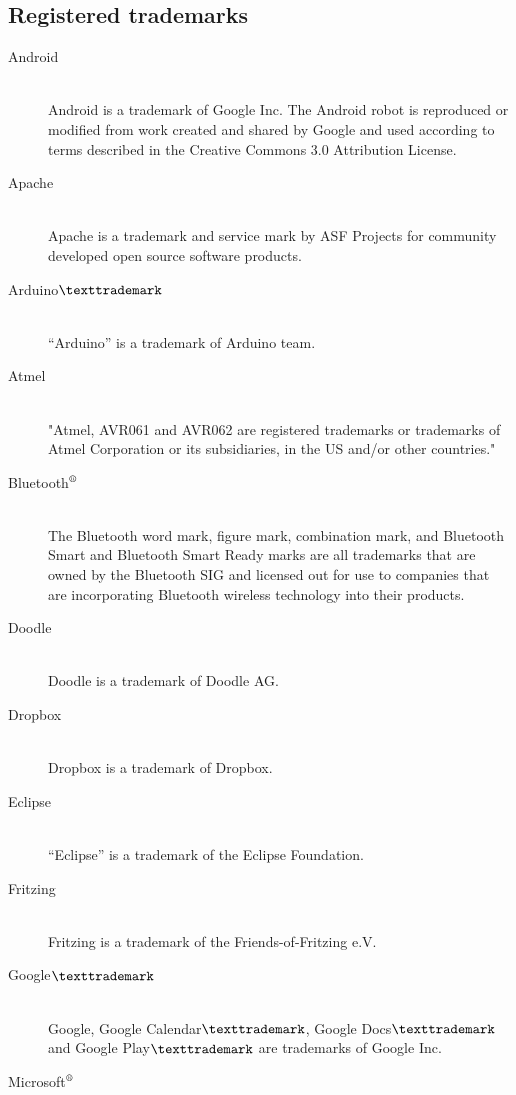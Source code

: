 \subsection{Registered trademarks}

\begin{description}
	\item[Android]\hfill \\
		Android is a trademark of Google Inc. \newline
		The Android robot is reproduced or modified from work created and shared by Google and used according to terms described in the Creative Commons 3.0 Attribution License.
	\item[Apache]\hfill \\
		Apache is a trademark and service mark by ASF Projects for community developed open source software products.
	\item[Arduino$\texttrademark$]\hfill \\
		``Arduino'' is a trademark of Arduino team.
	\item[Atmel]\hfill \\
		"Atmel, AVR061 and AVR062 are registered trademarks or trademarks of Atmel Corporation or its subsidiaries, in the US and/or other countries."
	\item[Bluetooth$\textsuperscript{\textregistered}$]\hfill \\
		The Bluetooth word mark, figure mark, combination mark, and Bluetooth Smart and Bluetooth Smart Ready marks are all trademarks that are owned by the Bluetooth SIG and licensed out for use to companies that are incorporating Bluetooth wireless technology into their products. 
	\item[Doodle]\hfill \\
		Doodle is a trademark of  Doodle AG.
	\item[Dropbox]\hfill \\
		Dropbox is a trademark of Dropbox.
	\item[Eclipse]\hfill \\
		 ``Eclipse'' is a trademark of the Eclipse Foundation.
	\item[Fritzing]\hfill \\
		Fritzing is a trademark of the Friends-of-Fritzing e.V.
	\item[Google$\texttrademark$]\hfill \\
		Google, Google Calendar$\texttrademark$, Google Docs$\texttrademark$ and Google Play$\texttrademark$ are trademarks of Google Inc.
	\item[Microsoft$\textsuperscript{\textregistered}$]\hfill \\

\end{description}
